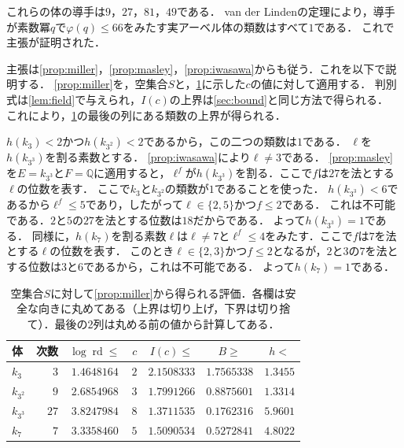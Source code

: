\documentclass[11pt,a4paper]{ltjsarticle}
\makeatletter
\theoremstyle{ja}
\renewenvironment{proof}[1][証明]{\par
  \pushQED{\qed}\normalfont \topsep6\p@\@plus6\p@\relax
  \trivlist
  \item[\hskip\labelsep\bfseries #1]\hspace{1\zw}\ignorespaces
}{\popQED\endtrivlist\@endpefalse}
\makeatother
\begin{document}
\begin{proof}
これらの体の導手は$9$，$27$，$81$，$49$である．
van der Lindenの定理\cite[Theorem 1]{vdL82}により，導手が素数冪$q$で$\varphi(q) \le 66$をみたす実アーベル体の類数はすべて$1$である．
これで主張が証明された．

主張は\cref{prop:miller}，\cref{prop:masley}，\cref{prop:iwasawa}からも従う．これを以下で説明する．
\cref{prop:miller}を，空集合$S$と，\cref{tab:sub}に示した$c$の値に対して適用する．
判別式は\cref{lem:field}で与えられ，$I(c)$の上界は\cref{sec:bound}と同じ方法で得られる．
これにより，\cref{tab:sub}の最後の列にある類数の上界が得られる．

$h(k_3) < 2$かつ$h(k_{3^2}) < 2$であるから，この二つの類数は$1$である．
$\ell$を$h(k_{3^3})$を割る素数とする．
\cref{prop:iwasawa}により$\ell \ne 3$である．
\cref{prop:masley}を$E = k_{3^3}$と$F = \mathbb{Q}$に適用すると，$\ell^f$が$h(k_{3^3})$を割る．ここで$f$は$27$を法とする$\ell$の位数を表す．
ここで$k_3$と$k_{3^2}$の類数が$1$であることを使った．
$h(k_{3^3}) < 6$であるから$\ell^f \le 5$であり，したがって$\ell \in \{2, 5\}$かつ$f \le 2$である．
これは不可能である．$2$と$5$の$27$を法とする位数は$18$だからである．
よって$h(k_{3^3}) = 1$である．
同様に，$h(k_7)$を割る素数$\ell$は$\ell \ne 7$と$\ell^f \le 4$をみたす．ここで$f$は$7$を法とする$\ell$の位数を表す．
このとき$\ell \in \{2, 3\}$かつ$f \le 2$となるが，$2$と$3$の$7$を法とする位数は$3$と$6$であるから，これは不可能である．
よって$h(k_7) = 1$である．
\end{proof}

\begin{table}[h]
\centering
\begin{tabular}{lrcrccc}
\toprule
体 & 次数 & $\log \operatorname{rd} \le$ & $c$ & $I(c) \le$ & $B \ge$ & $h <$ \\
\midrule
$k_3$ & $3$ & $1.4648164$ & $2$ & $2.1508333$ & $1.7565338$ & $1.3455$ \\
$k_{3^2}$ & $9$ & $2.6854968$ & $3$ & $1.7991266$ & $0.8875601$ & $1.3314$ \\
$k_{3^3}$ & $27$ & $3.8247984$ & $8$ & $1.3711535$ & $0.1762316$ & $5.9601$ \\
$k_7$ & $7$ & $3.3358460$ & $5$ & $1.5090534$ & $0.5272841$ & $4.8022$ \\
\bottomrule
\end{tabular}
\caption{空集合$S$に対して\cref{prop:miller}から得られる評価．各欄は安全な向きに丸めてある（上界は切り上げ，下界は切り捨て）．最後の2列は丸める前の値から計算してある．}
\label{tab:sub}
\end{table}
\end{document}
